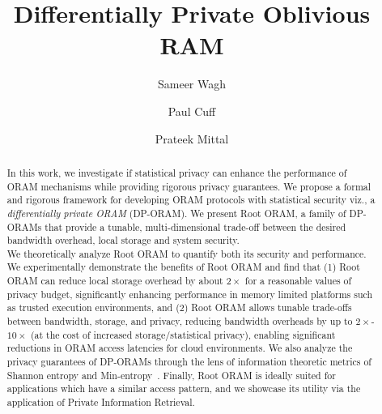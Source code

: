 \documentclass[USenglish,oneside,twocolumn]{article}
\newcommand{\ourprotocol}{Root ORAM}
\begin{document}
 
  \author*[1]{Sameer Wagh}
  \author[2]{Paul Cuff}
  \author[3]{Prateek Mittal}

\title{\huge Differentially Private Oblivious RAM}


\begin{abstract}
{In this work, we investigate if statistical privacy can 
enhance the performance of ORAM mechanisms while providing 
rigorous privacy guarantees. We propose a formal and rigorous framework for developing ORAM protocols with statistical security viz., a \textit{differentially private ORAM} (DP-ORAM).
We present \ourprotocol{}, a family of DP-ORAMs that provide a tunable, multi-dimensional 
trade-off between the desired bandwidth overhead, local storage and system security.\\
We theoretically analyze \ourprotocol{} to quantify both its security and performance.
We experimentally demonstrate the benefits of \ourprotocol{} and find that (1) \ourprotocol{} can reduce local storage overhead by about $2\times$ for a reasonable values of privacy budget, significantly enhancing performance in memory limited platforms such as trusted execution environments, and (2) \ourprotocol{} allows tunable trade-offs between bandwidth, storage, and privacy, reducing bandwidth overheads by up to $2\times$-$10\times$ (at the cost of increased storage/statistical privacy), enabling significant reductions in ORAM access latencies for cloud environments. We also analyze the privacy guarantees of DP-ORAMs through the lens of information theoretic metrics of Shannon entropy and Min-entropy~\cite{paulDP}. Finally, \ourprotocol{} is ideally suited for applications which have a similar access pattern, and we showcase its utility via the application of Private Information Retrieval.}
\end{abstract}






	\journalyear{}
 

\maketitle
\end{document}
